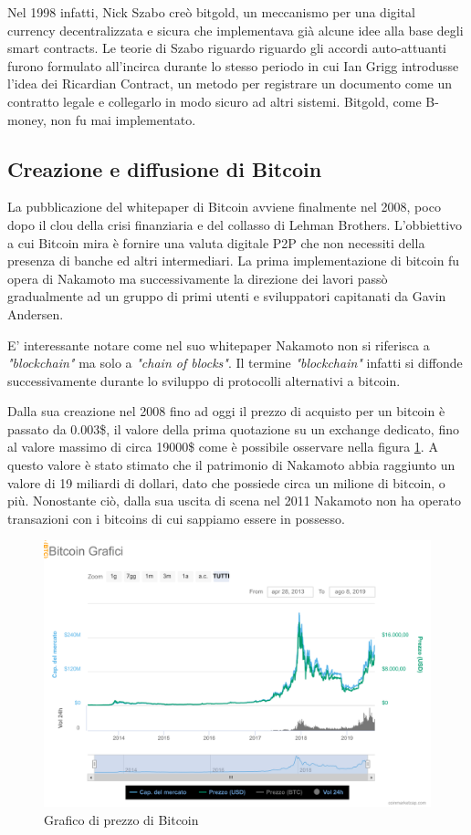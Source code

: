 Nel 1998 infatti, Nick Szabo creò bitgold\cite{K14}, un meccanismo per una digital currency decentralizzata e sicura che implementava già alcune idee alla base degli smart contracts. Le teorie di Szabo riguardo riguardo gli accordi auto-attuanti furono formulato all'incirca durante lo stesso periodo in cui Ian Grigg introdusse l'idea dei Ricardian Contract, un metodo per registrare un documento come un contratto legale e collegarlo in modo sicuro ad altri sistemi\cite{K15}. Bitgold, come B-money, non fu mai implementato.

\subsection{Creazione e diffusione di Bitcoin}

La pubblicazione del whitepaper di Bitcoin avviene finalmente nel 2008, poco dopo il clou della crisi finanziaria e del collasso di Lehman Brothers. L'obbiettivo a cui Bitcoin mira è fornire una valuta digitale P2P che non necessiti della presenza di banche ed altri intermediari.  La prima implementazione di bitcoin fu opera di Nakamoto ma successivamente la direzione dei lavori passò gradualmente ad un gruppo di primi utenti e sviluppatori capitanati da Gavin Andersen. 

E' interessante notare come nel suo whitepaper\cite{K1} Nakamoto non si riferisca a \textit{"blockchain"} ma solo a \textit{"chain of blocks"}. Il termine \textit{"blockchain"} infatti si diffonde successivamente durante lo sviluppo di protocolli alternativi a bitcoin. 

Dalla sua creazione nel 2008 fino ad oggi il prezzo di acquisto per un bitcoin è passato da  0.003\$, il valore della prima quotazione su un exchange dedicato, fino al valore massimo di circa 19000\$ come è possibile osservare nella figura \ref{fig:chartbitcoin}. A questo valore è stato stimato che il patrimonio di Nakamoto abbia raggiunto un valore di 19 miliardi di dollari, dato che possiede circa un milione di bitcoin, o più. Nonostante ciò, dalla sua uscita di scena nel 2011 Nakamoto non ha operato transazioni con i bitcoins di cui sappiamo essere in possesso. 
\begin{figure}[H]
  \includegraphics[width=\linewidth]{chartbitcoin.png}
  \caption{Grafico di prezzo di Bitcoin}
  \label{fig:chartbitcoin}
\end{figure}

